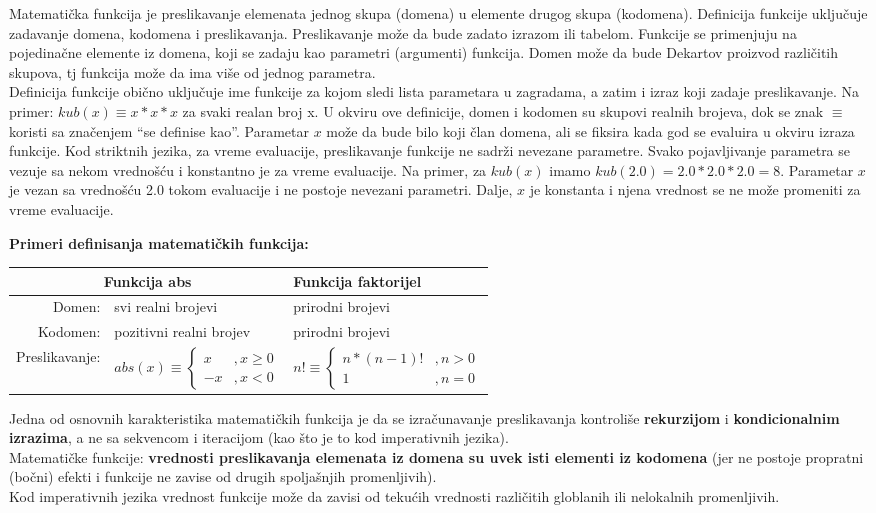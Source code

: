 \documentclass[../main.tex]{subfiles}
\begin{document}
	   Matematička funkcija je preslikavanje elemenata jednog skupa (domena) u elemente drugog skupa (kodomena). Definicija funkcije uključuje zadavanje domena, kodomena i preslikavanja. Preslikavanje može da bude zadato izrazom ili tabelom. Funkcije se primenjuju na pojedinačne elemente iz domena, koji se zadaju kao parametri (argumenti) funkcija. Domen može da bude Dekartov proizvod različitih skupova, tj funkcija može da ima više od jednog parametra. 
	   \\
	   Definicija funkcije obično uključuje ime funkcije za kojom sledi lista parametara u zagradama, a zatim i izraz koji zadaje preslikavanje. Na primer: $kub(x)\equiv x*x*x$ za svaki realan broj x. U okviru ove definicije, domen i kodomen su skupovi realnih brojeva, dok se znak $\equiv$ koristi sa značenjem ``se definise kao''. Parametar $x$ može da bude bilo koji član domena, ali se fiksira kada god se evaluira u okviru izraza funkcije.
	   Kod striktnih jezika, za vreme evaluacije, preslikavanje funkcije ne sadrži nevezane parametre. Svako pojavljivanje parametra se vezuje sa nekom vrednošću i konstantno je za vreme evaluacije. Na primer, za $kub(x)$ imamo $kub(2.0)=2.0*2.0*2.0=8$. Parametar $x$ je vezan sa vrednošću 2.0 tokom evaluacije i ne postoje nevezani parametri. Dalje, $x$ je konstanta i njena vrednost se ne može promeniti za vreme evaluacije.
	   \begin{boxprimer}
	   {\bf Primeri definisanja matematičkih funkcija:}
	   \\
	   \begin{tabularx}{\textwidth}{XXX|>{\hsize=1.1\hsize}X}
	   \multicolumn{3}{c|}{\textbf{Funkcija abs}} & \textbf{Funkcija faktorijel} \\
	   \hline
	   \multicolumn{2}{r|}{Domen:} & svi realni brojevi & prirodni brojevi \\ 
	   \multicolumn{2}{r|}{Kodomen:} & pozitivni realni brojev & prirodni brojevi \\
	   \multicolumn{2}{r|}{Preslikavanje:} &
	   \parbox{4cm}{$abs(x) \equiv \left\{\begin{array}{cc} x&,x\ge 0 \\-x&,x<0 \end{array}\right.$}
	   & 
	   \parbox{6cm}{$n! \equiv \left\{\begin{array}{cc} n*(n-1)!&, n> 0 \\1&, n=0 \end{array}\right.$}
	   
	   \end{tabularx}
	   \end{boxprimer}
	   Jedna od osnovnih karakteristika matematičkih funkcija je da se izračunavanje preslikavanja kontroliše {\bf rekurzijom} i {\bf kondicionalnim izrazima}, a ne sa sekvencom i iteracijom (kao što je to kod imperativnih jezika).
	   \\
	   Matematičke funkcije: {\bf vrednosti preslikavanja elemenata iz domena su uvek isti elementi iz kodomena} (jer ne postoje propratni (bočni) efekti i funkcije ne zavise od drugih spoljašnjih promenljivih).
	   \\
	   Kod imperativnih jezika vrednost funkcije može da zavisi od tekućih vrednosti različitih globlanih ili nelokalnih promenljivih.
	   
\end{document}
